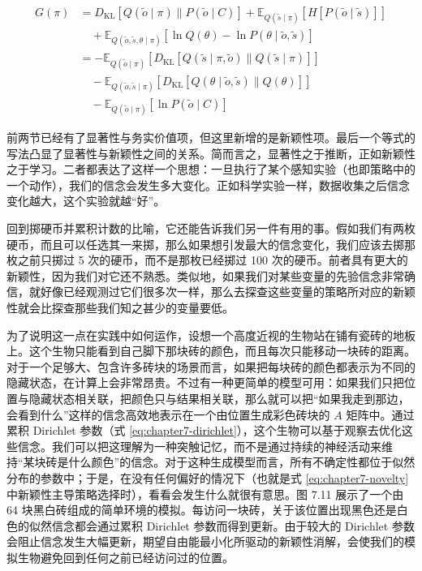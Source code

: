 \begin{equation}
\begin{aligned}
G(\pi) &= D_{\mathrm{KL}}[Q(\tilde{o}\mid \pi)\|P(\tilde{o}\mid C)] + \mathbb{E}_{Q(\tilde{s}\mid \pi)}[H[P(\tilde{o}\mid \tilde{s})]] \\
&\quad + \mathbb{E}_{Q(\tilde{o},\tilde{s},\theta\mid \pi)}[\ln Q(\theta)-\ln P(\theta\mid \tilde{o},\tilde{s})] \\
&= -\mathbb{E}_{Q(\tilde{o}\mid \pi)}\!\left[D_{\mathrm{KL}}[Q(\tilde{s}\mid \pi,\tilde{o})\|Q(\tilde{s}\mid \pi)]\right] \\
&\quad - \mathbb{E}_{Q(\tilde{o},\tilde{s}\mid \pi)}\!\left[D_{\mathrm{KL}}[Q(\theta\mid \tilde{o},\tilde{s})\|Q(\theta)]\right] \\
&\quad - \mathbb{E}_{Q(\tilde{o}\mid \pi)}[\ln P(\tilde{o}\mid C)]
\end{aligned}
\label{eq:chapter7-novelty}
\end{equation}

前两节已经有了显著性与务实价值项，但这里新增的是新颖性项。最后一个等式的写法凸显了显著性与新颖性之间的关系。简而言之，显著性之于推断，正如新颖性之于学习。二者都表达了这样一个思想：一旦执行了某个感知实验（也即策略中的一个动作），我们的信念会发生多大变化。正如科学实验一样，数据收集之后信念变化越大，这个实验就越“好”。

回到掷硬币并累积计数的比喻，它还能告诉我们另一件有用的事。假如我们有两枚硬币，而且可以任选其一来掷，那么如果想引发最大的信念变化，我们应该去掷那枚之前只掷过 5 次的硬币，而不是那枚已经掷过 100 次的硬币。前者具有更大的新颖性，因为我们对它还不熟悉。类似地，如果我们对某些变量的先验信念非常确信，就好像已经观测过它们很多次一样，那么去探查这些变量的策略所对应的新颖性就会比探查那些我们知之甚少的变量要低。

为了说明这一点在实践中如何运作，设想一个高度近视的生物站在铺有瓷砖的地板上。这个生物只能看到自己脚下那块砖的颜色，而且每次只能移动一块砖的距离。对于一个足够大、包含许多砖块的场景而言，如果把每块砖的颜色都表示为不同的隐藏状态，在计算上会非常昂贵。不过有一种更简单的模型可用：如果我们只把位置与隐藏状态相关联，把颜色只与结果相关联，那么就可以把“如果我走到那边，会看到什么”这样的信念高效地表示在一个由位置生成彩色砖块的 $A$ 矩阵中。通过累积 Dirichlet 参数（式 \eqref{eq:chapter7-dirichlet}），这个生物可以基于观察去优化这些信念。我们可以把这理解为一种突触记忆，而不是通过持续的神经活动来维持“某块砖是什么颜色”的信念。对于这种生成模型而言，所有不确定性都位于似然分布的参数中；于是，在没有任何偏好的情况下（也就是式 \eqref{eq:chapter7-novelty} 中新颖性主导策略选择时），看看会发生什么就很有意思。图 7.11 展示了一个由 64 块黑白砖组成的简单环境的模拟。每访问一块砖，关于该位置出现黑色还是白色的似然信念都会通过累积 Dirichlet 参数而得到更新。由于较大的 Dirichlet 参数会阻止信念发生大幅更新，期望自由能最小化所驱动的新颖性消解，会使我们的模拟生物避免回到任何之前已经访问过的位置。

